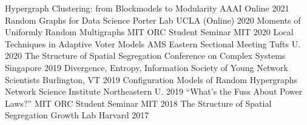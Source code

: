 

\begin{cvhonors}
    \cvhonor
        {Hypergraph Clustering: from Blockmodels to Modularity} %
        {AAAI} %
        {Online} %
        {2021} %
    \cvhonor
        {Random Graphs for Data Science} %
        {Porter Lab} %
        {UCLA (Online)} %
        {2020} %
    \cvhonor
        {Moments of Uniformly Random Multigraphs} %
        {MIT ORC Student Seminar} %
        {MIT} %
        {2020} %
      \cvhonor
        {Local Techniques in Adaptive Voter Models} %
        {AMS Eastern Sectional Meeting} %
        {Tufts U.} %
        {2020} %
    \cvhonor
        {The Structure of Spatial Segregation}
        {Conference on Complex Systems}
        {Singapore}
        {2019}
    \cvhonor
        {Divergence, Entropy, Information} %
        {Society of Young Network Scientists} %
        {Burlington, VT} %
        {2019} %
    \cvhonor
        {Configuration Models of Random Hypergraphs} %
        {Network Science Institute} %
        {Northeastern U. } %
        {2019} %
    \cvhonor
        {``What's the Fuss About Power Laws?''} %
        {MIT ORC Student Seminar} %
        {MIT} %
        {2018} %
    \cvhonor
        {The Structure of Spatial Segregation} %
        {Growth Lab} %
        {Harvard} %
        {2017} %
    
\end{cvhonors}


